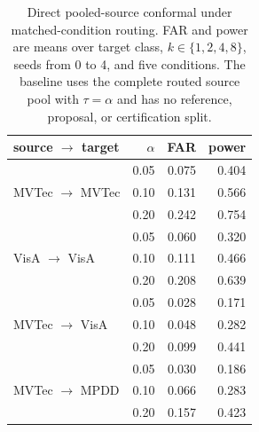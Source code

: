 \begin{table}[pos=t]
\centering
\caption{Direct pooled-source conformal under matched-condition routing. FAR and power are means over target class, $k\in\{1,2,4,8\}$, seeds from 0 to 4, and five conditions. The baseline uses the complete routed source pool with $\tau=\alpha$ and has no reference, proposal, or certification split.}
\label{tab:pooled-source-conformal}
\footnotesize
\setlength{\tabcolsep}{4pt}
\begin{tabular}{lrrr}
\toprule
source $\rightarrow$ target & $\alpha$ & FAR & power \\
\midrule
\multirow{3}{*}{MVTec $\rightarrow$ MVTec}
 & 0.05 & 0.075 & 0.404 \\
 & 0.10 & 0.131 & 0.566 \\
 & 0.20 & 0.242 & 0.754 \\
\cmidrule(lr){1-4}
\multirow{3}{*}{VisA $\rightarrow$ VisA}
 & 0.05 & 0.060 & 0.320 \\
 & 0.10 & 0.111 & 0.466 \\
 & 0.20 & 0.208 & 0.639 \\
\cmidrule(lr){1-4}
\multirow{3}{*}{MVTec $\rightarrow$ VisA}
 & 0.05 & 0.028 & 0.171 \\
 & 0.10 & 0.048 & 0.282 \\
 & 0.20 & 0.099 & 0.441 \\
\cmidrule(lr){1-4}
\multirow{3}{*}{MVTec $\rightarrow$ MPDD}
 & 0.05 & 0.030 & 0.186 \\
 & 0.10 & 0.066 & 0.283 \\
 & 0.20 & 0.157 & 0.423 \\
\bottomrule
\end{tabular}
\end{table}
